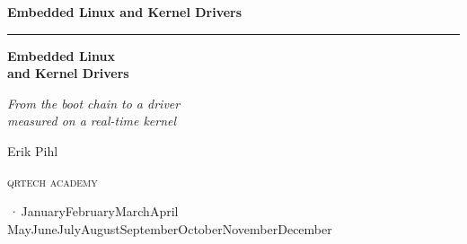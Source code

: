 %
\providecommand{\bookversion}{}
\newcommand{\bookdate}{\number\day\space\ifcase\month\or January\or February\or March\or April\or
  May\or June\or July\or August\or September\or October\or November\or December\fi\space
  \number\year}
\newcommand{\bookedition}{\ifx\bookversion\empty\else\bookversion\,·\,\fi\bookdate}

\thispagestyle{empty}
\vspace*{2.2in}
\begin{flushright}
  {\Large\bfseries Embedded Linux and Kernel Drivers}
\end{flushright}
\cleardoublepage

\thispagestyle{empty}
\vspace*{1.1in}
\begin{flushleft}
  {\color{accent}\rule{0.9in}{2.5pt}}\par\vspace{1.4ex}
  {\fontsize{32}{38}\selectfont\bfseries Embedded Linux\\[0.15ex] and Kernel Drivers\par}
  \vspace{2.2ex}
  {\Large\itshape From the boot chain to a driver\\measured on a real-time kernel\par}
  \vspace{1.2in}
  {\large Erik Pihl\par}
  \vfill
  {\small\scshape\lsstyle qrtech academy\par}
  \vspace{0.6ex}
  {\small\color{muted} \bookedition\par}
\end{flushleft}
\newpage

